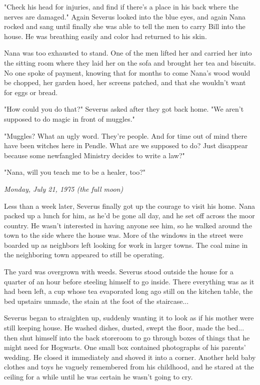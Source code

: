 \documentclass[a4paper,11pt]{article}
\begin{document}
"Check his head for injuries, and find if there's a place in his back where the nerves are damaged." Again Severus looked into the blue eyes, and again Nana rocked and sang until finally she was able to tell the men to carry Bill into the house. He was breathing easily and color had returned to his skin.

Nana was too exhausted to stand. One of the men lifted her and carried her into the sitting room where they laid her on the sofa and brought her tea and biscuits. No one spoke of payment, knowing that for months to come Nana's wood would be chopped, her garden hoed, her screens patched, and that she wouldn't want for eggs or bread.

"How could you do that?" Severus asked after they got back home. "We aren't supposed to do magic in front of muggles."

"Muggles? What an ugly word. They're people. And for time out of mind there have been witches here in Pendle. What are we supposed to do? Just disappear because some newfangled Ministry decides to write a law?"

"Nana, will you teach me to be a healer, too?"

\emph{Monday, July 21, 1975 (the full moon)}

Less than a week later, Severus finally got up the courage to visit his home. Nana packed up a lunch for him, as he'd be gone all day, and he set off across the moor country. He wasn't interested in having anyone see him, so he walked around the town to the side where the house was. More of the windows in the street were boarded up as neighbors left looking for work in larger towns. The coal mine in the neighboring town appeared to still be operating.

The yard was overgrown with weeds. Severus stood outside the house for a quarter of an hour before steeling himself to go inside. There everything was as it had been left, a cup whose tea evaporated long ago still on the kitchen table, the bed upstairs unmade, the stain at the foot of the staircase...

Severus began to straighten up, suddenly wanting it to look as if his mother were still keeping house. He washed dishes, dusted, swept the floor, made the bed... then shut himself into the back storeroom to go through boxes of things that he might need for Hogwarts. One small box contained photographs of his parents' wedding. He closed it immediately and shoved it into a corner. Another held baby clothes and toys he vaguely remembered from his childhood, and he stared at the ceiling for a while until he was certain he wasn't going to cry.
\end{document}
